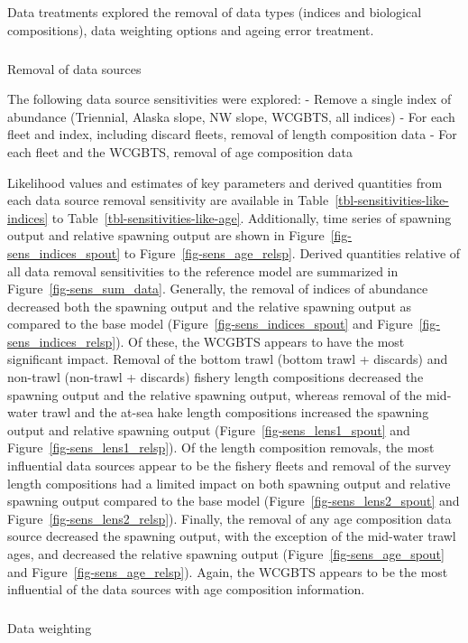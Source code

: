 \documentclass[
]{scrartcl}
\makeatletter
\let\oldsubparagraph\subparagraph
\renewcommand{\subparagraph}{
    \@ifstar
      \xxxSubParagraphStar
      \xxxSubParagraphNoStar
  }
\newcommand{\xxxSubParagraphStar}[1]{\oldsubparagraph*{#1}\mbox{}}
\newcommand{\xxxSubParagraphNoStar}[1]{\oldsubparagraph{#1}\mbox{}}
\makeatother
\begin{document}
Data treatments explored the removal of data types (indices and
biological compositions), data weighting options and ageing error
treatment.

\subparagraph{Removal of data sources}\label{removal-of-data-sources}

The following data source sensitivities were explored: - Remove a single
index of abundance (Triennial, Alaska slope, NW slope, WCGBTS, all
indices) - For each fleet and index, including discard fleets, removal
of length composition data - For each fleet and the WCGBTS, removal of
age composition data

Likelihood values and estimates of key parameters and derived quantities
from each data source removal sensitivity are available in
Table~\ref{tbl-sensitivities-like-indices} to
Table~\ref{tbl-sensitivities-like-age}. Additionally, time series of
spawning output and relative spawning output are shown in
Figure~\ref{fig-sens_indices_spout} to Figure~\ref{fig-sens_age_relsp}.
Derived quantities relative of all data removal sensitivities to the
reference model are summarized in Figure~\ref{fig-sens_sum_data}.
Generally, the removal of indices of abundance decreased both the
spawning output and the relative spawning output as compared to the base
model (Figure~\ref{fig-sens_indices_spout} and
Figure~\ref{fig-sens_indices_relsp}). Of these, the WCGBTS appears to
have the most significant impact. Removal of the bottom trawl (bottom
trawl + discards) and non-trawl (non-trawl + discards) fishery length
compositions decreased the spawning output and the relative spawning
output, whereas removal of the mid-water trawl and the at-sea hake
length compositions increased the spawning output and relative spawning
output (Figure~\ref{fig-sens_lens1_spout} and
Figure~\ref{fig-sens_lens1_relsp}). Of the length composition removals,
the most influential data sources appear to be the fishery fleets and
removal of the survey length compositions had a limited impact on both
spawning output and relative spawning output compared to the base model
(Figure~\ref{fig-sens_lens2_spout} and
Figure~\ref{fig-sens_lens2_relsp}). Finally, the removal of any age
composition data source decreased the spawning output, with the
exception of the mid-water trawl ages, and decreased the relative
spawning output (Figure~\ref{fig-sens_age_spout} and
Figure~\ref{fig-sens_age_relsp}). Again, the WCGBTS appears to be the
most influential of the data sources with age composition information.

\subparagraph{Data weighting}\label{data-weighting-1}
\end{document}

